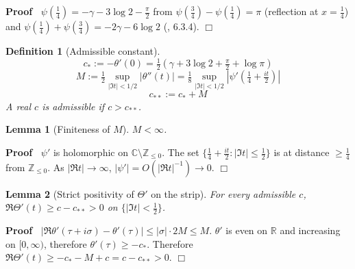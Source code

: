\documentclass{article}
\newcommand{\assign}{:=}
\newcommand{\tmem}[1]{{\em #1\/}}
\newenvironment{proof}{\noindent\textbf{Proof\ }}{\hspace*{\fill}$\Box$\medskip}
\newtheorem{definition}{Definition}
\newtheorem{lemma}{Lemma}
\begin{document}
\begin{proof}
  $\psi (\tfrac{1}{4}) = - \gamma - 3 \log 2 - \tfrac{\pi}{2}$ from $\psi
  (\tfrac{3}{4}) - \psi (\tfrac{1}{4}) = \pi$ (reflection at $x =
  \tfrac{1}{4}$) and $\psi (\tfrac{1}{4}) + \psi (\tfrac{3}{4}) = - 2 \gamma -
  6 \log 2$ ({\cite{AbramowitzStegun}}, {\textsection}6.3.4).
\end{proof}

\begin{definition}
  [Admissible constant]\label{def:cstar}
  \begin{equation}
    c_{\ast} \assign - \theta' (0) = \tfrac{1}{2} (\gamma + 3 \log 2 +
    \tfrac{\pi}{2} + \log \pi)
  \end{equation}
  \begin{equation}
    M \assign \tfrac{1}{2} \sup_{| \Im t| < 1 / 2} | \theta'' (t) | =
    \tfrac{1}{8} \sup_{| \Im t| < 1 / 2} | \psi' (\tfrac{1}{4} +
    \tfrac{it}{2}) |
  \end{equation}
  \begin{equation}
    c_{\ast \ast} \assign c_{\ast} + M
  \end{equation}
  A real $c$ is {\tmem{admissible}} if $c > c_{\ast \ast}$.
\end{definition}

\begin{lemma}
  [Finiteness of $M$]\label{lem:Mfinite} $M < \infty$.
\end{lemma}

\begin{proof}
  $\psi'$ is holomorphic on $\mathbb{C} \setminus \mathbb{Z}_{\le 0}$. The set
  $\{ \tfrac{1}{4} + \tfrac{it}{2} : | \Im t| \le \tfrac{1}{2} \}$ is at
  distance $\ge \tfrac{1}{4}$ from $\mathbb{Z}_{\le 0}$. As $| \Re t| \to
  \infty$, $| \psi' | = O (| \Re t|^{- 1}) \to 0$.
\end{proof}

\begin{lemma}
  [Strict positivity of $\Theta'$ on the strip]\label{lem:tildenonvan} For
  every admissible $c$, $\Re \Theta' (t) \ge c - c_{\ast \ast} > 0$ on $\{|
  \Im t| < \tfrac{1}{2} \}$.
\end{lemma}

\begin{proof}
  $| \Re \theta' (\tau + i \sigma) - \theta' (\tau) | \le | \sigma | \cdot 2 M
  \le M$. $\theta'$ is even on $\mathbb{R}$ and increasing on $[0, \infty)$,
  therefore $\theta' (\tau) \ge - c_{\ast}$. Therefore $\Re \Theta' (t) \ge -
  c_{\ast} - M + c = c - c_{\ast \ast} > 0$.
\end{proof}
\end{document}
